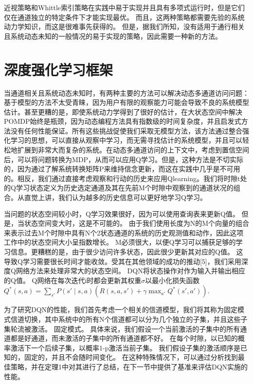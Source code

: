 近视策略和Whittle索引策略在实践中易于实现并且具有多项式运行时，但是它们仅在通道独立的特定条件下才能实现最优。 而且，这两种策略都需要先验的系统动力学知识，而这是很难事先获得的。 但是，据我们所知，没有适用于通行相关且系统动态未知的一般情况的易于实现的策略，因此需要一种新的方法。

\section{  深度强化学习框架    }
当通道相关且系统动态未知时，有两种主要的方法可以解决动态多通道访问问题：基于模型的方法不太受青睐，因为用户有限的观察能力可能会导致不良的系统模型估计。甚至更糟的是，即使系统动力学得到了很好的估计，在大状态空间中解决POMDP始终是瓶颈，因为动态编程方法具有指数级的时间复杂度，并且启发式方法没有任何性能保证。所有这些挑战促使我们采取无模型方法，该方法通过整合强化学习的思想，可以直接从观察中学习，而无需寻找估计的系统模型，并且可以轻松地扩展到非常大而复杂的系统。在动态多通道访问的上下文中，考虑到置信空间后，可以将问题转换为MDP，从而可以应用Q学习。但是，这种方法是不切实际的，因为通过了解系统转换矩阵P来维持信念更新，而这在实践中几乎是不可用的。相反，我们通过直接考虑观察和行动的历史来应用Qlearning。我们将时隙t处的Q学习状态定义为历史选定通道及其在先前M个时隙中观察到的通道状况的组合。从直觉上讲，我们认为越多的历史信息可以更好地学习Q学习。

当问题的状态空间较小时，Q学习效果很好，因为可以使用查询表来更新Q值。 但是，当状态空间变大时，这是不可能的。 由于我们使用长度为N的M个向量的组合来表示过去M个时隙中具有N个2状态通道的系统的历史观测值和动作，因此这项工作中的状态空间大小呈指数增长。 M必须很大，以便Q学习可以捕获足够的学习信息。更糟糕的是，由于很少访问许多状态，因此很少更新其对应的Q值。 这导致Q学习需要很长时间才能收敛。受其在其他领域的成功的推动[5]，我们采用深度Q网络方法来处理非常大的状态空间。 DQN将状态操作对作为输入并输出相应的Q值。 Q网络在每次迭代i时都会更新其权重$\sigma$以最小化损失函数$Q^{*}\left ( s,a \right )=\sum _{{s}'}P\left ( {s}'\mid s,a \right )\left ( R\left ( s,a,{s}' \right ) +\gamma\max _{{a}'}Q^{*}\left ( {s}' ,{a}'\right )\right )$.

为了研究DQN的性能，我们首先考虑一个相关的信道模型，我们将其称为固定模式信道切换，其中系统中的所有N个信道都可以分为几个独立的子集，并且这些子集轮流被激活。 固定模式。 具体来说，我们假设一个当前激活的子集中的所有通道都是好通道，而未激活的子集中的所有通道都不好。 在每个时隙，以已知的概率激活下一个后续子集，以概率1-p激活当前子集。 我们假设子集的激活顺序是已知的，固定的，并且不会随时间变化。 在这种特殊情况下，可以通过分析找到最佳策略，并在定理1中对其进行了总结，在下一节中提供了基准来评估DQN实施的性能。

